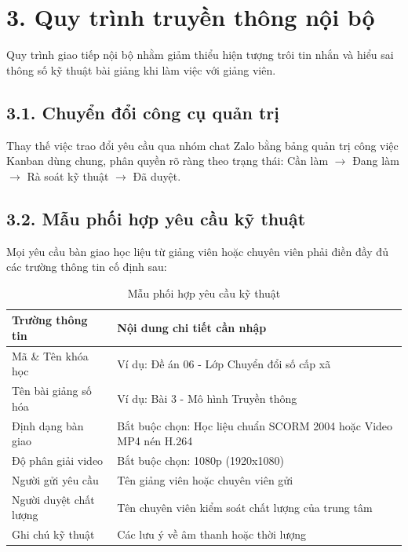 \documentclass[12pt]{article}
\begin{document}
\newpage

\section*{3. Quy trình truyền thông nội bộ}

Quy trình giao tiếp nội bộ nhằm giảm thiểu hiện tượng trôi tin nhắn và hiểu sai thông số kỹ thuật bài giảng khi làm việc với giảng viên.

\subsection*{3.1. Chuyển đổi công cụ quản trị}
Thay thế việc trao đổi yêu cầu qua nhóm chat Zalo bằng bảng quản trị công việc Kanban dùng chung, phân quyền rõ ràng theo trạng thái: Cần làm $\rightarrow$ Đang làm $\rightarrow$ Rà soát kỹ thuật $\rightarrow$ Đã duyệt.

\subsection*{3.2. Mẫu phối hợp yêu cầu kỹ thuật}
Mọi yêu cầu bàn giao học liệu từ giảng viên hoặc chuyên viên phải điền đầy đủ các trường thông tin cố định sau:

\begin{table}[htbp]
\centering
\fontsize{11}{14}\selectfont
\begin{tabular}{|p{5.5cm}|p{8.5cm}|}
\hline
\textbf{Trường thông tin} & \textbf{Nội dung chi tiết cần nhập} \\ \hline
Mã \& Tên khóa học & Ví dụ: Đề án 06 - Lớp Chuyển đổi số cấp xã \\ \hline
Tên bài giảng số hóa & Ví dụ: Bài 3 - Mô hình Truyền thông \\ \hline
Định dạng bàn giao & Bắt buộc chọn: Học liệu chuẩn SCORM 2004 hoặc Video MP4 nén H.264 \\ \hline
Độ phân giải video & Bắt buộc chọn: 1080p (1920x1080) \\ \hline
Người gửi yêu cầu & Tên giảng viên hoặc chuyên viên gửi \\ \hline
Người duyệt chất lượng & Tên chuyên viên kiểm soát chất lượng của trung tâm \\ \hline
Ghi chú kỹ thuật & Các lưu ý về âm thanh hoặc thời lượng \\ \hline
\end{tabular}
\caption{Mẫu phối hợp yêu cầu kỹ thuật}
\label{tab:collab_spec}
\end{table}
\end{document}
